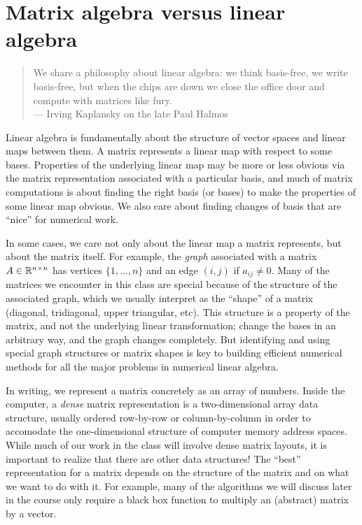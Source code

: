 \documentclass[12pt, leqno]{article} %
\begin{document}

\section{Matrix algebra versus linear algebra}

\begin{quotation}
  We share a philosophy about linear algebra: we think basis-free, we write basis-free, but when the chips are down we close the office door and compute with matrices like fury. \\
  \hspace*{\fill} --- Irving Kaplansky
  on the late Paul Halmos%
\end{quotation}

Linear algebra is fundamentally about the structure of vector spaces
and linear maps between them.  A matrix represents a linear map with
respect to some bases.  Properties of the underlying linear map may
be more or less obvious via the matrix representation associated with
a particular basis, and much of matrix computations is about finding
the right basis (or bases) to make the properties of some linear map
obvious.  We also care about finding changes of basis that are ``nice''
for numerical work.

In some cases, we care not only about the linear map a matrix
represents, but about the matrix itself.  For example, the {\em graph}
associated with a matrix $A \in \mathbb{R}^{n \times n}$ has vertices $\{1,
\ldots, n\}$ and an edge $(i,j)$ if $a_{ij} \neq 0$.  Many of the
matrices we encounter in this class are special because of the structure
of the associated graph, which we usually interpret as the ``shape'' of
a matrix (diagonal, tridiagonal, upper triangular, etc).  This structure
is a property of the matrix, and not the underlying linear
transformation; change the bases in an arbitrary way, and the graph
changes completely.  But identifying and using special graph structures
or matrix shapes is key to building efficient numerical methods for all
the major problems in numerical linear algebra.

In writing, we represent a matrix concretely as an array of numbers.
Inside the computer, a {\em dense} matrix representation is a
two-dimensional array data structure, usually ordered row-by-row or
column-by-column in order to accomodate the one-dimensional structure of
computer memory address spaces.  While much of our work in the class
will involve dense matrix layouts, it is important to realize that there
are other data structures!  The ``best'' representation for a matrix
depends on the structure of the matrix and on what we want to do with
it.  For example, many of the algorithms we will discuss later in the
course only require a black box function to multiply an (abstract)
matrix by a vector.
\end{document}
